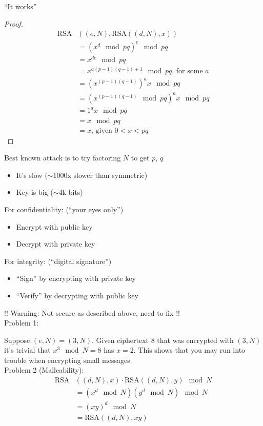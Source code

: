 \begin{theorem*}``It works''
\end{theorem*}
\begin{proof}
    \begin{align*}
    \text{RSA}&((e,N), \text{RSA}((d,N), x))\\
    &= (x^d \mod{pq})^e \mod{pq}\\
    &= x^{de} \mod{pq}\\
    &= x^{a(p-1)(q-1)+1} \mod{pq} \text{, for some $a$}\\
    &= (x^{(p-1)(q-1)})^a x \mod{pq}\\
    &= (x^{(p-1)(q-1)} \mod{pq})^a x \mod{pq}\\
    &= 1^a x \mod{pq}\\
    &= x \mod{pq}\\
    &= x \text{, given $0 < x < pq$}
    \end{align*}
\end{proof}
Best known attack is to try factoring $N$ to get $p$, $q$
\begin{itemize}
    \item It's slow ($\sim$1000x slower than symmetric)
    \item Key is big ($\sim$4k bits)
\end{itemize}
For confidentiality: (``your eyes only'')
\begin{itemize}
    \item Encrypt with public key
    \item Decrypt with private key
\end{itemize}
For integrity: (``digital signature'')
\begin{itemize}
    \item ``Sign'' by encrypting with private key
    \item ``Verify'' by decrypting with public key
\end{itemize}
!! Warning: Not secure as described above, need to fix !!\\

Problem 1:

Suppose $(e, N) = (3, N)$. Given ciphertext $8$ that was encrypted with $(3, N)$
it's trivial that $x^3 \mod N =8$ has $x = 2$. This shows that you may run into
trouble when encrypting small messages.\\

Problem 2 (Malleability):
\begin{align*}
\text{RSA}&((d,N),x) \cdot \text{RSA}((d,N),y) \mod N\\
&= (x^d \mod N)(y^d \mod N) \mod N\\
&= (xy)^d \mod N\\
&= \text{RSA}((d,N), xy)
\end{align*}

